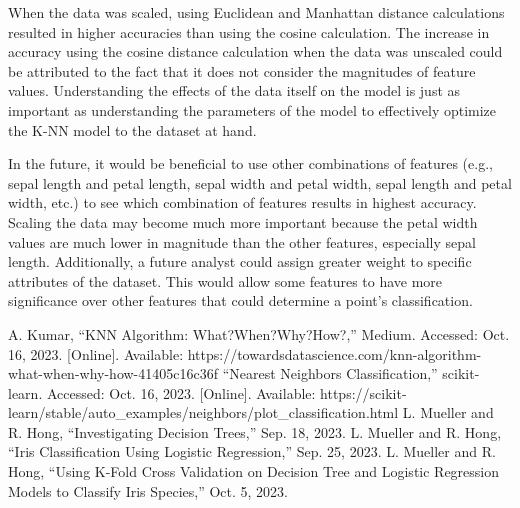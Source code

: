 \documentclass[journal]{IEEEtran}
\begin{document}
When the data was scaled, using Euclidean and Manhattan distance calculations resulted in higher accuracies than using the cosine calculation. The increase in accuracy using the cosine distance calculation when the data was unscaled could be attributed to the fact that it does not consider the magnitudes of feature values. Understanding the effects of the data itself on the model is just as important as understanding the parameters of the model to effectively optimize the K-NN model to the dataset at hand. 

In the future, it would be beneficial to use other combinations of features (e.g., sepal length and petal length, sepal width and petal width, sepal length and petal width, etc.) to see which combination of features results in highest accuracy. Scaling the data may become much more important because the petal width values are much lower in magnitude than the other features, especially sepal length. Additionally, a future analyst could assign greater weight to specific attributes of the dataset. This would allow some features to have more significance over other features that could determine a point’s classification. 


\newpage 

\begin{thebibliography}{00}
A. Kumar, “KNN Algorithm: What?When?Why?How?,” Medium. Accessed: Oct. 16, 2023. [Online]. Available: https://towardsdatascience.com/knn-algorithm-what-when-why-how-41405c16c36f
“Nearest Neighbors Classification,” scikit-learn. Accessed: Oct. 16, 2023. [Online]. Available: https://scikit-learn/stable/auto\_examples/neighbors/plot\_classification.html
L. Mueller and R. Hong, “Investigating Decision Trees,” Sep. 18, 2023.
L. Mueller and R. Hong, “Iris Classification Using Logistic Regression,” Sep. 25, 2023.
L. Mueller and R. Hong, “Using K-Fold Cross Validation on Decision Tree and Logistic Regression Models to Classify Iris Species,” Oct. 5, 2023.

\end{thebibliography}
\end{document}
